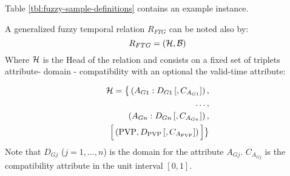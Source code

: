 \begin{definition}
Table \ref{tbl:fuzzy-sample-definitions} contains an example instance.





% 
% 
% 
% 
 A generalized fuzzy temporal relation $R_{FTG}$ can be noted also by:
\label{def:generalized-fuzzy-temporal-relation}
\begin{equation}
\label{eq:generalized-fuzzy-temporal-relation}
R_{FTG} = \left(\mathcal{H}, \mathcal{B} \right)
\end{equation}
Where $\mathcal{H}$ is the Head of the relation and consists on a fixed set of triplets attribute- domain - compatibility with an optional the valid-time attribute:

\begin{align}
\label{eq:head-valid-time}
\mathcal{H} = \big \lbrace \left(A_{G1}:D_{G1}\left[,C_{A_{G1}} \right] \right),\\
\nonumber
 \ldots,\\
 \nonumber
  \left(A_{Gn}:D_{Gn}\left[,C_{A_{Gn}} \right] \right),\\
  \nonumber
  \Big[  \left( \text{PVP}, D_{\text{PVP}}\left[,C_{A_{\text{PVP}}} \right] \right) \Big] \big \rbrace
\end{align}
Note that $D_{Gj}$ ($j = 1, \ldots, n$) is the domain for the attribute $A_{Gj}$. $C_{A_{Gj}}$ is the compatibility attribute in the unit interval $\left[0, 1 \right]$.


\end{definition}
